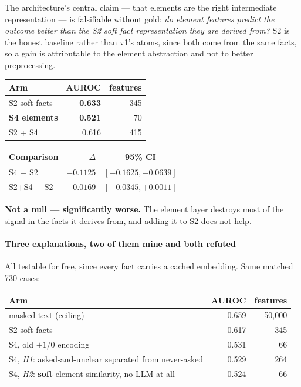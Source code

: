 \documentclass[12pt,a4paper]{article}
\begin{document}
The architecture's central claim --- that elements are the right intermediate representation --- is
falsifiable without gold: \emph{do element features predict the outcome better than the S2 soft fact
representation they are derived from?} S2 is the honest baseline rather than v1's atoms, since both
come from the same facts, so a gain is attributable to the element abstraction and not to better
preprocessing.

\begin{center}
\begin{tabular}{@{}lrr@{}}
\toprule
\textbf{Arm} & \textbf{AUROC} & \textbf{features} \\
\midrule
S2 soft facts & \textbf{0.633} & 345 \\
\textbf{S4 elements} & \textbf{0.521} & 70 \\
S2 + S4 & 0.616 & 415 \\
\bottomrule
\end{tabular}
\quad
\begin{tabular}{@{}lrc@{}}
\toprule
\textbf{Comparison} & \textbf{$\Delta$} & \textbf{95\% CI} \\
\midrule
S4 $-$ S2 & $-0.1125$ & $[-0.1625, -0.0639]$ \\
S2{+}S4 $-$ S2 & $-0.0169$ & $[-0.0345, +0.0011]$ \\
\bottomrule
\end{tabular}
\end{center}

\textbf{Not a null --- significantly worse.} The element layer destroys most of the signal in the
facts it derives from, and adding it to S2 does not help.

\paragraph{Three explanations, two of them mine and both refuted} All testable for free, since every
fact carries a cached embedding. Same matched 730 cases:

\begin{center}
\begin{tabular}{@{}lrr@{}}
\toprule
\textbf{Arm} & \textbf{AUROC} & \textbf{features} \\
\midrule
masked text (ceiling) & 0.659 & 50,000 \\
S2 soft facts & 0.617 & 345 \\
S4, old $\pm1/0$ encoding & 0.531 & 66 \\
S4, \emph{H1}: asked-and-unclear separated from never-asked & 0.529 & 264 \\
S4, \emph{H2}: \textbf{soft} element similarity, no LLM at all & 0.524 & 66 \\
\bottomrule
\end{tabular}
\end{center}
\end{document}
